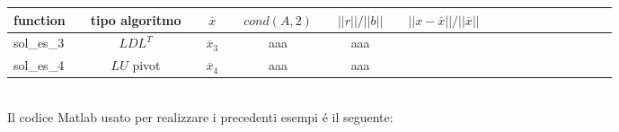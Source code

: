 \begin{tabular}{l*{20}{c}}
function & \vline& tipo algoritmo & \vline& \(\overline{x}\) & \vline& \(cond(A, 2)\) & \vline& \(||r||/||b||\) & \vline& \(||x-\overline{x}||/||\overline{x}||\) \\
\hline
sol\_es\_3 & \vline& \(LDL^T\)    & \vline& \(\overline{x}_3\) & \vline& aaa      & \vline& aaa	 \\
sol\_es\_4 & \vline& \(LU\) pivot & \vline& \(\overline{x}_4\) & \vline& aaa      & \vline& aaa	 \\

\end{tabular} \\

\noindent Il codice Matlab usato per realizzare i precedenti esempi \'e il seguente:

